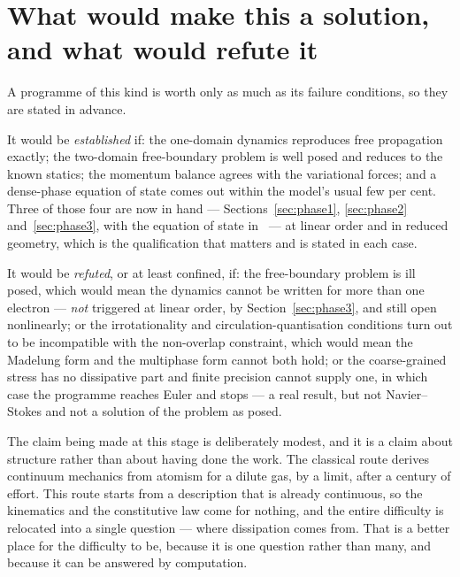 \documentclass[11pt]{article}
\begin{document}
\section{What would make this a solution, and what would refute it}\label{sec:settle}

A programme of this kind is worth only as much as its failure conditions, so they are stated in
advance.

It would be \emph{established} if: the one-domain dynamics reproduces free propagation exactly; the
two-domain free-boundary problem is well posed and reduces to the known statics; the momentum
balance agrees with the variational forces; and a dense-phase equation of state comes out within the
model's usual few per cent. Three of those four are now in hand ---
Sections~\ref{sec:phase1}, \ref{sec:phase2} and~\ref{sec:phase3}, with the equation of state in~\cite{elasticity} --- at linear order and in reduced geometry, which is the qualification
that matters and is stated in each case.

It would be \emph{refuted}, or at least confined, if: the free-boundary problem is ill posed, which
would mean the dynamics cannot be written for more than one electron --- \emph{not} triggered at
linear order, by Section~\ref{sec:phase3}, and still open nonlinearly; or the irrotationality and
circulation-quantisation conditions turn out to be incompatible with the non-overlap constraint,
which would mean the Madelung form and the multiphase form cannot both hold; or the coarse-grained
stress has no dissipative part and finite precision cannot supply one, in which case the programme
reaches Euler and stops --- a real result, but not Navier--Stokes and not a solution of the problem
as posed.

The claim being made at this stage is deliberately modest, and it is a claim about structure rather
than about having done the work. The classical route derives continuum mechanics from atomism for a
dilute gas, by a limit, after a century of effort. This route starts from a description that is
already continuous, so the kinematics and the constitutive law come for nothing, and the entire
difficulty is relocated into a single question --- where dissipation comes from. That is a better
place for the difficulty to be, because it is one question rather than many, and because it can be
answered by computation.
\end{document}
